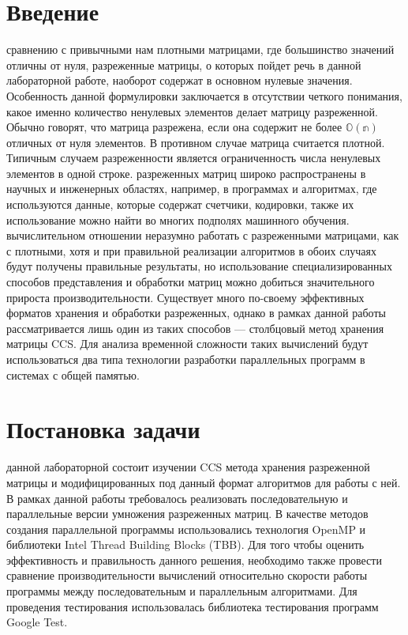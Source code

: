 \documentclass{report}
\begin{document}
\setcounter{page}{2}
\tableofcontents
\newpage

\section*{Введение}
 сравнению с привычными нам плотными матрицами, где большинство значений отличны от нуля, разреженные матрицы, о которых пойдет речь в данной лабораторной работе, наоборот содержат в основном нулевые значения. Особенность данной формулировки заключается в отсутствии четкого понимания, какое именно количество ненулевых элементов делает матрицу разреженной. Обычно говорят, что матрица разрежена, если она содержит не более $\mathbb{O(n)}$ отличных от нуля элементов. В противном случае матрица считается плотной. Типичным случаем разреженности является ограниченность числа ненулевых элементов в одной строке.
 разреженных матриц широко распространены в научных и инженерных областях, например, в программах и алгоритмах, где используются данные, которые содержат счетчики, кодировки, также их использование можно найти во многих подполях машинного обучения.
 вычислительном отношении неразумно работать с разреженными матрицами, как с плотными, хотя и при правильной реализации алгоритмов в обоих случаях будут получены правильные результаты, но использование специализированных способов представления и обработки матриц можно добиться значительного прироста производительности. Существует много по-своему эффективных форматов хранения и обработки разреженных, однако в рамках данной работы рассматривается лишь один из таких способов — столбцовый метод хранения матрицы CCS. Для анализа временной сложности таких вычислений будут использоваться два типа технологии разработки параллельных программ в системах с общей памятью.
\newpage

\section*{Постановка задачи}
 данной лабораторной состоит изучении CCS метода хранения разреженной матрицы и модифицированных под данный формат алгоритмов для работы с ней. В рамках данной работы требовалось реализовать последовательную и параллельные версии умножения разреженных матриц. В качестве методов создания параллельной программы использовались технология OpenMP и библиотеки Intel Thread Building Blocks (TBB). Для того чтобы оценить эффективность и правильность данного решения, необходимо также провести сравнение производительности вычислений относительно скорости работы программы между последовательным и параллельным алгоритмами. Для  проведения тестирования использовалась библиотека тестирования программ Google Test.
\newpage
\end{document}
